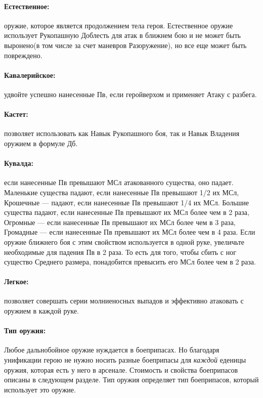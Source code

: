 \paragraph{Естественное:} оружие, которое является продолжением тела героя. Естественное оружие использует Рукопашную Доблесть для атак в ближнем бою и не может быть выронено(в том числе за счет маневров Разоружение), но все еще может быть повреждено.
\paragraph{Кавалерийское:} удвойте успешно нанесенные Пв, если геройверхом и применяет Атаку с разбега.
\paragraph{Кастет:} позволяет использовать как Навык Рукопашного боя, так и Навык Владения оружием в формуле Дб.
\paragraph{Кувалда:} если нанесенные Пв превышают МСл атакованного существа, оно падает. 
\newline
Маленькие существа падают, если нанесенные Пв превышают 1/2 их МСл, Крошечные — падают, если нанесенные Пв превышают 1/4 их МСл.
\newline
Большие существа падают, если нанесенные Пв превышают их МСл более чем в 2 раза, Огромные — если нанесенные Пв превышают их МСл более чем в 3 раза, Громадные — если нанесенные Пв превышают их МСл более чем в 4 раза.
\newline
Если оружие ближнего боя с этим свойством используется в одной руке, увеличьте необходимые для падения Пв в 2 раза. То есть для того, чтобы сбить с ног существо Среднего размера, понадобится превысить его МСл более чем в 2 раза.
\paragraph{Легкое:} позволяет совершать серии молниеносных выпадов и эффективно атаковать с оружием в каждой руке.
\paragraph{Тип оружия:} Любое дальнобойное оружие нуждается в боеприпасах. Но благодаря унификации герою не нужно носить разные боеприпасы для \textit{каждой} еденицы оружия, которая есть у него в арсенале. Стоимость и свойства боеприпасов описаны в следующем разделе. Тип оружия определяет тип боеприпасов, который использует это оружие.
